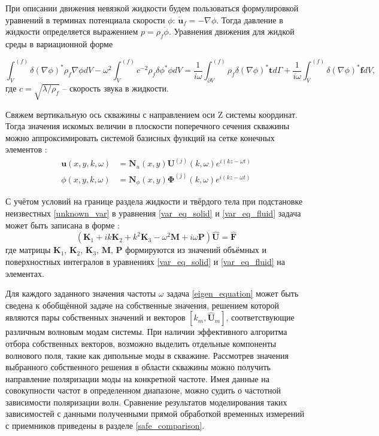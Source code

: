 \documentclass[a4paper,11pt]{article}
\begin{document}
При описании движения невязкой жидкости будем пользоваться формулировкой уравнений в терминах потенциала скорости $\phi$: $\dot{\mathbf{u}}_f = - \nabla \phi$. Тогда давление в жидкости определяется выражением $p = \rho_f \dot{\phi}$. Уравнения движения для жидкой среды в вариационной форме 

\begin{equation}
\int_{V}^{(f)} \delta (\nabla\phi)^* \rho_f  \nabla \phi dV - \omega^2 \int_{V}^{(f)}  c^{-2} \rho_f \delta \phi^*  \phi dV = \frac{1}{i\omega}\int_{\partial V}^{(f)} \rho_f \delta(\nabla \phi)^* \mathbf{t} d\Gamma + \frac{1}{i\omega} \int_{V}^{(f)} \delta(\nabla \phi)^* \mathbf{f} dV, \label{var_eq_fluid}
\end{equation}
где $c = \sqrt{\lambda/\rho_f}$ -- скорость звука в жидкости.

Свяжем вертикальную ось скважины с направлением оси Z системы координат. Тогда значения искомых величин в плоскости поперечного сечения скважины можно аппроксимировать системой базисных функций на сетке конечных элементов \cite{Zienkiewicz2000}:
\begin{equation}
\begin{split}
\mathbf{u}(x,y,k,\omega) & = \mathbf{N}_u(x,y) \mathbf{U}^{(j)}(k,\omega) e^{i(kz-\omega t)} \\
\phi(x,y,k,\omega) & = \mathbf{N}_{\phi}(x,y) \mathbf{\Phi}^{(j)}(k,\omega) e^{i(kz-\omega t)}
\end{split} \label{unknown_var}
\end{equation}

С учётом условий на границе раздела жидкости и твёрдого тела при подстановке неизвестных \eqref{unknown_var} в уравнения \eqref{var_eq_solid} и \eqref{var_eq_fluid} задача может быть записана в форме \cite{Bartoli2006,Treyssede2013}:
\begin{equation}
(\mathbf{K}_1 + i k \mathbf{K}_2 + k^2 \mathbf{K}_3 - \omega^2 \mathbf{M} + i \omega \mathbf{P}) \hat{\mathbf{U}} = \hat{\mathbf{F}} \label{eigen_equation}
\end{equation}
где матрицы $\mathbf{K}_1$, $\mathbf{K}_2$, $\mathbf{K}_3$, $\mathbf{M}$, $\mathbf{P}$ формируются из значений объёмных и поверхностных интегралов в уравнениях \eqref{var_eq_solid} и \eqref{var_eq_fluid} на элементах.

Для каждого заданного значения частоты $\omega$ задача \eqref{eigen_equation} может быть сведена к обобщённой задаче на собственные значения, решением которой являются пары собственных значений и векторов $[k_m, \hat{\mathbf{U}}_m]$, соответствующие различным волновым модам системы. При наличии эффективного алгоритма отбора собственных векторов, возможно выделить отдельные компоненты волнового поля, такие как дипольные моды в скважине. Рассмотрев значения выбранного собственного решения в области скважины можно получить направление поляризации моды на конкретной частоте. Имея данные на совокупности частот в определенном диапазоне, можно судить о частотной зависимости поляризации волн. Сравнение результатов моделирования таких зависимостей с данными полученными прямой обработкой временных измерений с приемников приведены в разделе \ref{safe_comparison}.
\end{document}
